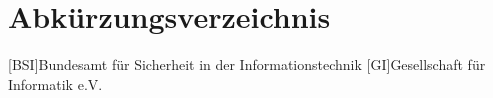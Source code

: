 
\chapter*{Abkürzungsverzeichnis}                   %
						         				   

\begin{acronym}[DHBW]


[BSI]{\abkspace Bundesamt für Sicherheit in der Informationstechnik}
[GI]{\abkspace Gesellschaft für Informatik e.V.}

 
\end{acronym}

